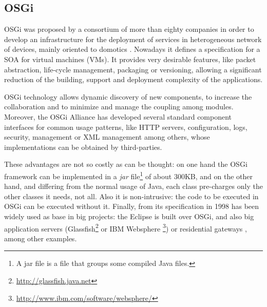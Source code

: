 \subsection{OSGi}

OSGi was proposed by a consortium of more than
eighty companies in order to develop an infrastructure for the
deployment of services in heterogeneous network of devices, mainly
oriented to domotics \cite{GarciaSanchez2013Gateway}. Nowadays it defines a
specification for a SOA for virtual
machines (VMs). It provides very desirable features, like
packet abstraction, life-cycle management, packaging or versioning, %
allowing a significant reduction of the building, support and deployment
complexity of the applications. 

OSGi technology allows dynamic discovery of new components, to increase the collaboration and to minimize and manage the coupling
among modules. Moreover, the
OSGi Alliance has developed several standard component interfaces for
common usage patterns, like HTTP servers, configuration, logs, security,
management or XML management among others, whose implementations can
be obtained by third-parties. %

These advantages are not so
                               costly as can be thought: on one hand the OSGi
                                framework can be implemented in a
                                {\em jar} file\footnote{A jar file is
                                a file that groups some compiled Java
                                files.} of about 300KB, and on the other hand, and differing from
                                the normal usage of Java, each
                                class pre-charges only the other
                                classes it needs, not all. Also it is
                                non-intrusive: the code to be
                                executed in OSGi can be executed
                                without it. Finally, from its
                                specification in 1998 has been widely
                                used as base in big projects: the
                                Eclipse  is built over OSGi, and
                                also big application servers
                               (Glassfish\footnote{\url{http://glassfish.java.net}} 
                               or IBM Websphere \footnote{\url{http://www.ibm.com/software/websphere/}}) or
                               residential gateways
                               \cite{GarciaSanchez2013Gateway}, among other
                               examples. 



